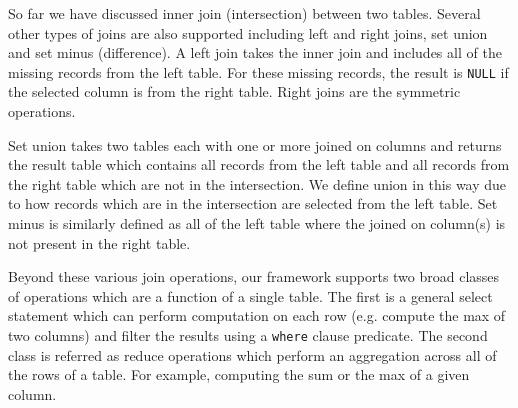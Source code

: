 So far we have discussed inner join (intersection) between two tables. Several other types of joins are also supported including left and right joins, set union and set minus (difference). A left join takes the inner join and includes all of the missing records from the left table. For these missing records, the result is \texttt{NULL} if the selected column is from the right table. Right joins are the symmetric operations. 

Set union takes two tables each with one or more joined on columns and returns the result table which contains all records from the left table and all records from the right table which are not in the intersection. We define union in this way due to how records which are in the intersection are selected from the left table. Set minus is similarly defined as all of the left table where the joined on column(s) is not present in the right table. 

Beyond these various join operations, our framework supports two broad classes of operations which are a function of a single table. The first is a general select statement which can perform computation on each row (e.g. compute the max of two columns) and filter the results using a \texttt{where} clause predicate. The second class is referred as reduce operations which perform an aggregation across all of the rows of a table. For example, computing the sum or the max of a given column. 


